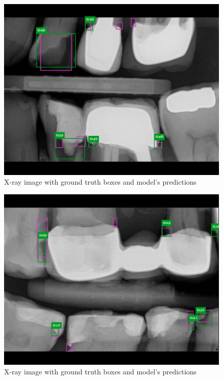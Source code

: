 \begin{figure}[H]
    \includegraphics[width=0.9\linewidth]{images/rest1.png}
    \caption{X-ray image with ground truth boxes and model's predictions}
    \label{fig:pred_img3}
\end{figure}

\begin{figure}[H]
    \includegraphics[width=0.9\linewidth]{images/rest2.png}
    \caption{X-ray image with ground truth boxes and model's predictions}
    \label{fig:pred_img4}
\end{figure}

